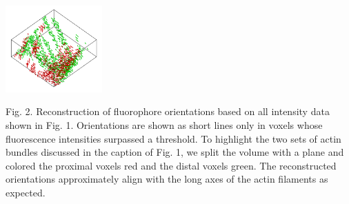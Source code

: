 \documentclass[letterpaper,10pt]{article}
\begin{document}
\begin{minipage}{.263\textwidth}
  \includegraphics[width=3.7cm, trim={0cm 0cm 0 0cm}, right]{figs/roi2/recon_color-min.png}
\end{minipage}%
\begin{minipage}{.639\textwidth}
  Fig. 2. Reconstruction of fluorophore orientations based on all intensity
    data shown in Fig. 1. Orientations are shown as short lines only in voxels
    whose fluorescence intensities surpassed a threshold. To highlight the two
    sets of actin bundles discussed in the caption of Fig. 1, we split the
    volume with a plane and colored the proximal voxels red and the distal
    voxels green. The reconstructed orientations approximately align with the
    long axes of the actin filaments as expected.
\end{minipage}
 \vspace{-1em}
{\footnotesize{}}

\end{document}
